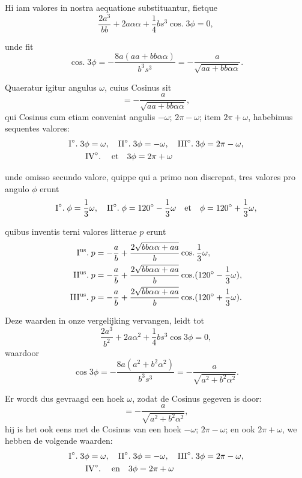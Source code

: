 \documentclass[10pt,a4paper]{article}
\DeclareMathOperator{\cosg}{cos.}
\begin{document}
\begin{paracol}{2}
\begin{enumerate}[topsep=1px]
		\newpage
		\switchcolumn*
		\par Hi iam valores in nostra aequatione substituantur, fietque
		\[
			\frac{2a^3}{bb}+2a\alpha \alpha + \frac{1}{4}bs^3\cosg 3\phi = 0,
		\]
		\par unde fit
		\[
			\cosg 3\phi = - \frac{8a(aa + bb\alpha \alpha)}{b^3s^3} =-\frac{a}{\sqrt{aa+bb\alpha \alpha}}.
		\]
		\par Quaeratur igitur angulus $\omega$, cuius Cosinus sit
		\[
			= -\frac{a}{\sqrt{aa+bb\alpha \alpha}},
		\]
		qui Cosinus cum etiam conveniat angulis $-\omega$; $2\pi - \omega$; item $2\pi + \omega$, habebimus sequentes valores:
		\begin{align*}
			&\text{I}\degree.\;3\phi = \omega, \quad \text{II}\degree.\; 3\phi = -\omega, \quad \text{III}\degree.\; 3\phi = 2\pi - \omega, \\
			&\qquad \text{IV}\degree.\; \quad \text{et} \quad 3\phi = 2\pi+\omega
		\end{align*}
		\par unde omisso secundo valore, quippe qui a primo non discrepat, tres valores pro angulo $\phi$ erunt
		\[
			\text{I}\degree.\; \phi = \frac{1}{3}\omega, \quad \text{II}\degree.\; \phi = 120\degree - \frac{1}{3}\omega \quad \text{et}\quad  \phi = 120\degree +\frac{1}{3}\omega,
		\]
		\par quibus inventis terni valores litterae $p$ erunt
		\begin{align*}
			\text{I\textsuperscript{us}.}\;  p &= -\frac{a}{b}+\frac{2\sqrt{bb\alpha \alpha + aa}}{b} \cosg \frac{1}{3} \omega,\\
			\text{II\textsuperscript{us}.}\; p &= -\frac{a}{b}+\frac{2\sqrt{bb\alpha \alpha + aa}}{b} \cosg (120\degree - \frac{1}{3}\omega),\\
			\text{III\textsuperscript{us}.}\; p & = -\frac{a}{b}+\frac{2\sqrt{bb\alpha \alpha+aa}}{b} \cosg (120\degree + \frac{1}{3}\omega).
		\end{align*}
		
		\switchcolumn
		
		\par Deze waarden in onze vergelijking vervangen, leidt tot
		\[
			\frac{2a^3}{b^2}+2a\alpha^2 + \frac{1}{4}bs^3\cos 3\phi = 0,
		\]
		waardoor
		\[
			\cos 3\phi = - \frac{8a(a^2 + b^2\alpha^2)}{b^3s^3} =-\frac{a}{\sqrt{a^2+b^2\alpha^2}}.
		\]
		\par Er wordt dus gevraagd een hoek $\omega$, zodat de Cosinus gegeven is door: 
		\[
			= -\frac{a}{\sqrt{a^2+b^2\alpha^2}},
		\]
		hij is het ook eens met de Cosinus van een hoek $-\omega$; $2\pi - \omega$; en ook $2\pi+\omega$, we hebben de volgende waarden:
		\begin{align*}
			&\text{I}\degree.\;3\phi = \omega, \quad \text{II}\degree.\; 3\phi = -\omega, \quad \text{III}\degree.\; 3\phi = 2\pi - \omega, \\
			&\qquad \text{IV}\degree.\; \quad \text{en} \quad 3\phi = 2\pi+\omega
		\end{align*}
		

\end{enumerate}
\end{paracol}
\end{document}
